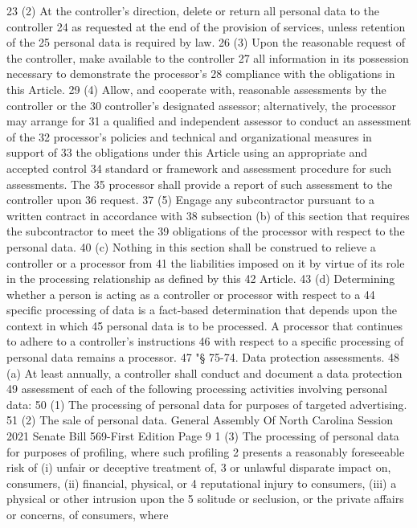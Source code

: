 23 (2) At the controller's direction, delete or return all personal data to the controller
24 as requested at the end of the provision of services, unless retention of the
25 personal data is required by law.
26 (3) Upon the reasonable request of the controller, make available to the controller
27 all information in its possession necessary to demonstrate the processor's
28 compliance with the obligations in this Article.
29 (4) Allow, and cooperate with, reasonable assessments by the controller or the
30 controller's designated assessor; alternatively, the processor may arrange for
31 a qualified and independent assessor to conduct an assessment of the
32 processor's policies and technical and organizational measures in support of
33 the obligations under this Article using an appropriate and accepted control
34 standard or framework and assessment procedure for such assessments. The
35 processor shall provide a report of such assessment to the controller upon
36 request.
37 (5) Engage any subcontractor pursuant to a written contract in accordance with
38 subsection (b) of this section that requires the subcontractor to meet the
39 obligations of the processor with respect to the personal data.
40 (c) Nothing in this section shall be construed to relieve a controller or a processor from
41 the liabilities imposed on it by virtue of its role in the processing relationship as defined by this
42 Article.
43 (d) Determining whether a person is acting as a controller or processor with respect to a
44 specific processing of data is a fact-based determination that depends upon the context in which
45 personal data is to be processed. A processor that continues to adhere to a controller's instructions
46 with respect to a specific processing of personal data remains a processor.
47 "§ 75-74. Data protection assessments.
48 (a) At least annually, a controller shall conduct and document a data protection
49 assessment of each of the following processing activities involving personal data:
50 (1) The processing of personal data for purposes of targeted advertising.
51 (2) The sale of personal data.
General Assembly Of North Carolina Session 2021
Senate Bill 569-First Edition Page 9
1 (3) The processing of personal data for purposes of profiling, where such profiling
2 presents a reasonably foreseeable risk of (i) unfair or deceptive treatment of,
3 or unlawful disparate impact on, consumers, (ii) financial, physical, or
4 reputational injury to consumers, (iii) a physical or other intrusion upon the
5 solitude or seclusion, or the private affairs or concerns, of consumers, where
